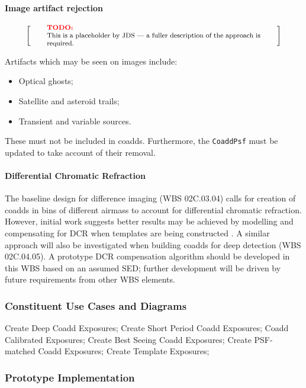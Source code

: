 \documentclass[12pt]{article}
\newcommand{\wbsDiffim}{WBS 02C.03.04}
\newcommand{\wbsDetDeblend}{WBS 02C.04.05}
\newenvironment{note}[1][Note]
{
  \begin{displaymath}
    \left[ \qquad
    \begin{minipage}[h]{.75\linewidth}
      \color{red} \footnotesize
      \textbf{#1:} \newline
      \color{black}
}
{
    \end{minipage}
    \normalsize
    \qquad \right]
  \end{displaymath}
}
\begin{document}
\paragraph{Image artifact rejection}

\begin{note}[TODO]
This is a placeholder by JDS --- a fuller description of the approach is required.
\end{note}

Artifacts which may be seen on images include:

\begin{itemize}
  \item{Optical ghosts;}
  \item{Satellite and asteroid trails;}
  \item{Transient and variable sources.}
\end{itemize}

These must not be included in coadds. Furthermore, the \texttt{CoaddPsf} must be updated to take account of their removal.

\paragraph{Differential Chromatic Refraction}

The baseline design for difference imaging (\wbsDiffim) calls for creation of coadds in bins of different airmass to account for differential chromatic refraction. However, initial work suggests better results may be achieved by modelling and compensating for DCR when templates are being constructed \cite{Becker14}. A similar approach will also be investigated when building coadds for deep detection (\wbsDetDeblend). A prototype DCR compensation algorithm should be developed in this WBS based on an assumed SED; further development will be driven by future requirements from other WBS elements.

\subsubsection{Constituent Use Cases and Diagrams}

Create Deep Coadd Exposures; Create Short Period Coadd Exposures; Coadd Calibrated Exposures; Create Best Seeing Coadd Exposures; Create PSF-matched Coadd Exposures;
Create Template Exposures;

\subsubsection{Prototype Implementation}
\end{document}
